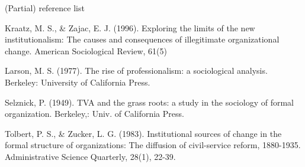 \begin{frame}{(Partial) reference list}
\begin{itemize}
{		\item Kraatz, M. S., \& Zajac, E. J. (1996). Exploring the limits of the new institutionalism: The causes and consequences of illegitimate organizational change. American Sociological Review, 61(5)%
		\item Larson, M. S. (1977). The rise of professionalism: a sociological analysis. Berkeley: University of California Press.
		\item Selznick, P. (1949). TVA and the grass roots: a study in the sociology of formal organization. Berkeley,: Univ. of California Press.
		\item Tolbert, P. S., \& Zucker, L. G. (1983). Institutional sources of change in the formal structure of organizations: The diffusion of civil-service reform, 1880-1935. Administrative Science Quarterly, 28(1), 22-39. 
		
	}		
	\end{itemize}

\end{frame}



